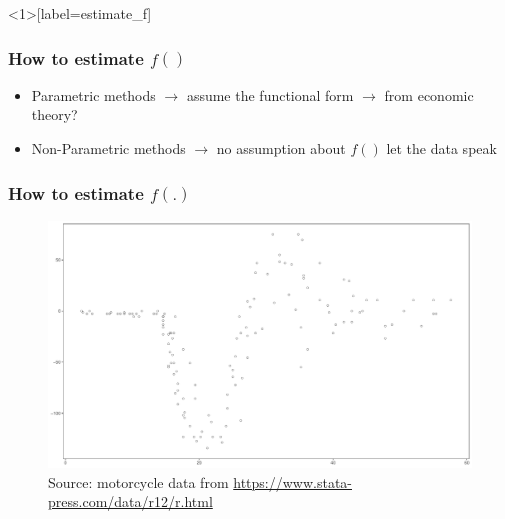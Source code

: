 \documentclass[
  shownotes,
  xcolor={svgnames},
  hyperref={colorlinks,citecolor=DarkBlue,linkcolor=DarkRed,urlcolor=DarkBlue}
  ]{beamer}
\begin{document}

\begin{frame}<1>[label=estimate_f]
\frametitle{How to estimate $f()$}


\begin{itemize}
  \item Parametric methods $\rightarrow$ assume the functional form $\rightarrow$ from economic theory?
  \pause
  \medskip
  \item Non-Parametric methods $\rightarrow$ no assumption about $f()$ let the data speak

\end{itemize}

\end{frame}




\begin{frame}
\frametitle{How to estimate $f(.)$}




\begin{figure}[H] \centering
  \centering
  \includegraphics[scale=0.25]{figures/fig_1.pdf}
  \\
  \tiny
  Source: motorcycle data from \url{https://www.stata-press.com/data/r12/r.html}
\end{figure}


\end{frame}

\end{document}
